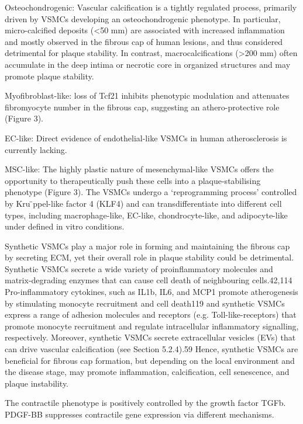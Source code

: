 Osteochondrogenic: Vascular calcification is a tightly regulated process, primarily driven by VSMCs developing an osteochondrogenic phenotype. In particular, micro-calcified deposits (<50 mm) are associated with increased inflammation and mostly observed in the fibrous cap of human lesions, and thus considered detrimental for plaque stability. In contrast, macrocalcifications (>200 mm) often accumulate in the deep intima or necrotic core in organized structures and may promote plaque stability.

Myofibroblast-like: loss of Tcf21 inhibits phenotypic modulation and attenuates fibromyocyte number in the fibrous cap, suggesting an athero-protective role (Figure 3).

EC-like: Direct evidence of endothelial-like VSMCs in human atherosclerosis is currently lacking.

MSC-like: The highly plastic nature of mesenchymal-like VSMCs offers the opportunity to therapeutically push these cells into a plaque-stabilising phenotype (Figure 3). The VSMCs undergo a ‘reprogramming process’ controlled by Kru ̈ppel-like factor 4 (KLF4) and can transdifferentiate into different cell types, including macrophage-like, EC-like, chondrocyte-like, and adipocyte-like under defined in vitro conditions.




Synthetic VSMCs play a major role in forming and maintaining the fibrous cap by secreting ECM, yet their overall role in plaque stability could be detrimental. Synthetic VSMCs secrete a wide variety of proinflammatory molecules and matrix-degrading enzymes that can cause cell death of neighbouring cells.42,114 Pro-inflammatory cytokines, such as IL1b, IL6, and MCP1 promote atherogenesis by stimulating monocyte recruitment and cell death119 and synthetic VSMCs express a range of adhesion molecules and receptors (e.g. Toll-like-receptors) that promote monocyte recruitment and regulate intracellular inflammatory signalling, respectively. Moreover, synthetic VSMCs secrete extracellular vesicles (EVs) that can drive vascular calcification (see Section 5.2.4).59 Hence, synthetic VSMCs are beneficial for fibrous cap formation, but depending on the local environment and the disease stage, may promote inflammation, calcification, cell senescence, and plaque instability.



The contractile phenotype is positively controlled by the growth factor TGFb.
PDGF-BB suppresses contractile gene expression via different mechanisms.
\cite{grootaertVascularSmoothMuscle2021}

